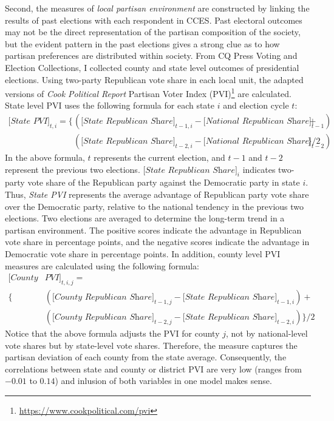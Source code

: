 \documentclass[letterpaper, 12pt]{article}
\begin{document}
    \par Second, the measures of \textit{local partisan environment} are constructed by linking the results of past elections with each respondent in CCES. Past electoral outcomes may not be the direct representation of the partisan composition of the society, but the evident pattern in the past elections gives a strong clue as to how partisan preferences are distributed within society. From CQ Press Voting and Election Collections, I collected county and state level outcomes of presidential elections. Using two-party Republican vote share in each local unit, the adapted versions of \textit{Cook Political Report} Partisan Voter Index (PVI)\footnote{\url{https://www.cookpolitical.com/pvi}} are calculated. State level PVI uses the following formula for each state $i$ and election cycle $t$: 
    \begin{align*}
    \textit{[State PVI]}_{t,i} = \{ & (\textit{[State Republican Share]}_{t-1, i} - \textit{[National Republican Share]}_{t-1}) + \\  
    &(\textit{[State Republican Share]}_{t-2, i} - \textit{[National Republican Share]}_{t-2}) \}/2
    \end{align*}    
    \noindent In the above formula, $t$ represents the current election, and $t-1$ and $t-2$ represent the previous two elections. $\textit{[State Republican Share]}_i$ indicates two-party vote share of the Republican party against the Democratic party in state $i$. Thus, \textit{State PVI} represents the average advantage of Republican party vote share over the Democratic party, relative to the national tendency in the previous two elections. Two elections are averaged to determine the long-term trend in a partisan environment. The positive scores indicate the advantage in Republican vote share in percentage points, and the negative scores indicate the advantage in Democratic vote share in percentage points. In addition, county level PVI measures are calculated using the following formula:
    \begin{align*}
        \textit{[County}& \textit{PVI]}_{t,i,j} = \\
        \{ &(\textit{[County Republican Share]}_{t-1, j} - \textit{[State Republican Share]}_{t-1,i}) + \\  
        &(\textit{[County Republican Share]}_{t-2, j} - \textit{[State Republican Share]}_{t-2, i}) \}/2
    \end{align*}    
    \noindent Notice that the above formula adjusts the PVI for county $j$, not by national-level vote shares but by state-level vote shares. Therefore, the measure captures the partisan deviation of each county from the state average. Consequently, the correlations between state and county or district PVI are very low (ranges from $-0.01$ to $0.14$) and inlusion of both variables in one model makes sense.
        
\end{document}
